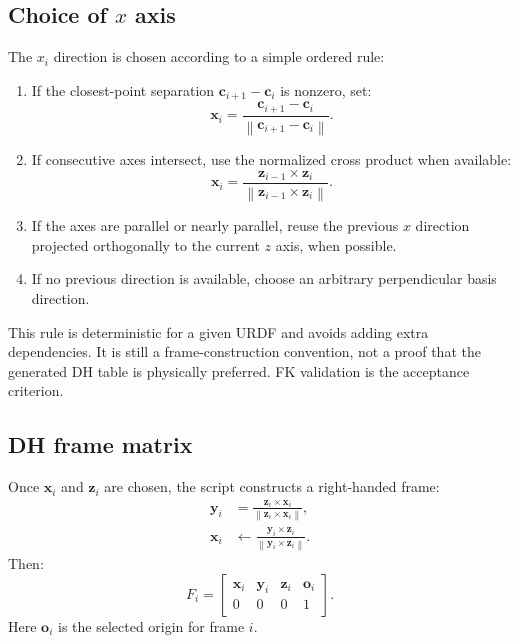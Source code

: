 \documentclass[11pt,a4paper]{article}
\newcommand{\norm}[1]{\left\lVert #1 \right\rVert}
\begin{document}
\subsection{Choice of $x$ axis}

The $x_i$ direction is chosen according to a simple ordered rule:
\begin{enumerate}
  \item If the closest-point separation $\bm{c}_{i+1}-\bm{c}_i$ is nonzero, set:
  \begin{equation}
    \bm{x}_i = \frac{\bm{c}_{i+1}-\bm{c}_i}{\norm{\bm{c}_{i+1}-\bm{c}_i}}.
  \end{equation}
  \item If consecutive axes intersect, use the normalized cross product when available:
  \begin{equation}
    \bm{x}_i = \frac{\bm{z}_{i-1}\times\bm{z}_i}{\norm{\bm{z}_{i-1}\times\bm{z}_i}}.
  \end{equation}
  \item If the axes are parallel or nearly parallel, reuse the previous $x$ direction projected orthogonally to the current $z$ axis, when possible.
  \item If no previous direction is available, choose an arbitrary perpendicular basis direction.
\end{enumerate}

This rule is deterministic for a given URDF and avoids adding extra dependencies. It is still a frame-construction convention, not a proof that the generated DH table is physically preferred. FK validation is the acceptance criterion.

\subsection{DH frame matrix}

Once $\bm{x}_i$ and $\bm{z}_i$ are chosen, the script constructs a right-handed frame:
\begin{align}
  \bm{y}_i &= \frac{\bm{z}_i\times\bm{x}_i}{\norm{\bm{z}_i\times\bm{x}_i}}, \\
  \bm{x}_i &\leftarrow \frac{\bm{y}_i\times\bm{z}_i}{\norm{\bm{y}_i\times\bm{z}_i}}.
\end{align}
Then:
\begin{equation}
  F_i = \begin{bmatrix}
    \bm{x}_i & \bm{y}_i & \bm{z}_i & \bm{o}_i \\
    0 & 0 & 0 & 1
  \end{bmatrix}.
\end{equation}
Here $\bm{o}_i$ is the selected origin for frame $i$.
\end{document}
